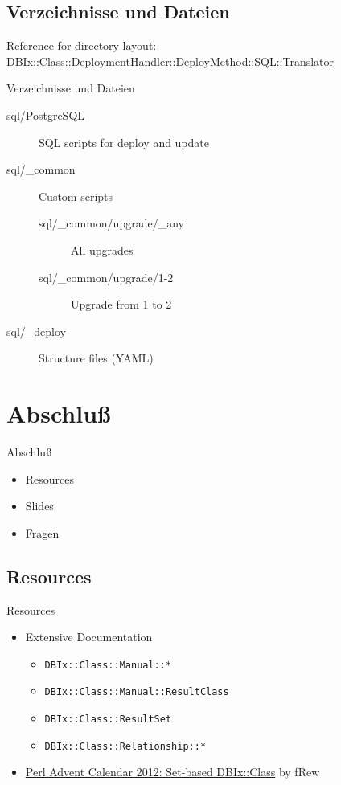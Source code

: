 \subsection{Verzeichnisse und Dateien}

Reference for directory layout:
\href{https://metacpan.org/pod/DBIx::Class::DeploymentHandler::DeployMethod::SQL::Translator}{DBIx::Class::DeploymentHandler::DeployMethod::SQL::Translator}

\begin{frame}[fragile]{Verzeichnisse und Dateien}
\begin{description}
\item[sql/PostgreSQL] SQL scripts for deploy and update
\item[sql/\_common] Custom scripts
\begin{description}
\item[sql/\_common/upgrade/\_any] All upgrades
\item[sql/\_common/upgrade/1-2] Upgrade from 1 to 2
\end{description}
\item[sql/\_deploy] Structure files (YAML)
\end{description}
\end{frame}

\section{Abschluß}

\begin{frame}{Abschluß}
\begin{itemize}
\item Resources
\item Slides
\item Fragen
\end{itemize}
\end{frame}

\subsection{Resources}
\begin{frame}[fragile]{Resources}
\begin{itemize}
\item Extensive Documentation
\begin{itemize}
\item \verb|DBIx::Class::Manual::*|
\item \verb|DBIx::Class::Manual::ResultClass|
\item \verb|DBIx::Class::ResultSet|
\item \verb|DBIx::Class::Relationship::*|
\end{itemize}
\item \href{http://www.perladvent.org/2012/2012-12-21.html}
{Perl Advent Calendar 2012: Set-based DBIx::Class}
by fRew
\end{itemize}
\end{frame}

